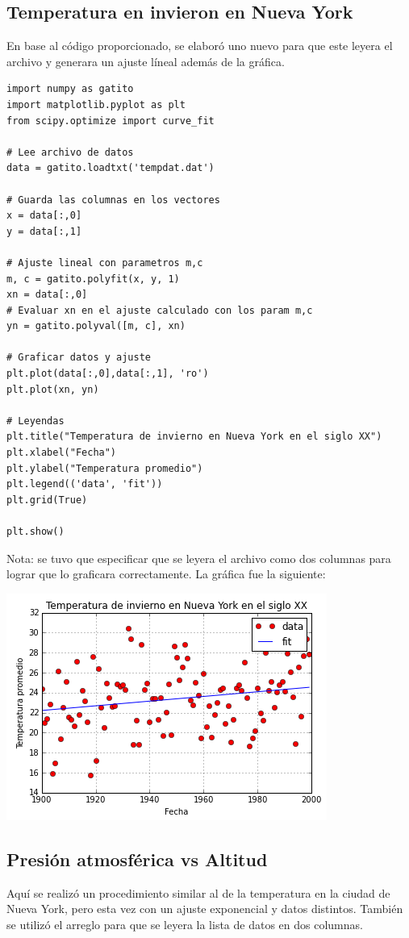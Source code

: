 \documentclass[12pt,letterpaper]{article}
\begin{document}
\subsection{Temperatura en invieron en Nueva York}
En base al código proporcionado, se elaboró uno nuevo para que este leyera el archivo y generara un ajuste líneal además de la gráfica.

\begin{verbatim}
import numpy as gatito
import matplotlib.pyplot as plt
from scipy.optimize import curve_fit

# Lee archivo de datos
data = gatito.loadtxt('tempdat.dat')

# Guarda las columnas en los vectores
x = data[:,0]
y = data[:,1]

# Ajuste lineal con parametros m,c
m, c = gatito.polyfit(x, y, 1)
xn = data[:,0]
# Evaluar xn en el ajuste calculado con los param m,c
yn = gatito.polyval([m, c], xn)

# Graficar datos y ajuste
plt.plot(data[:,0],data[:,1], 'ro')
plt.plot(xn, yn)

# Leyendas
plt.title("Temperatura de invierno en Nueva York en el siglo XX")
plt.xlabel("Fecha")
plt.ylabel("Temperatura promedio")
plt.legend(('data', 'fit'))
plt.grid(True)

plt.show()
\end{verbatim}
Nota: se tuvo que especificar que se leyera el archivo como dos columnas para lograr que lo graficara correctamente. La gráfica fue la siguiente:

\begin{center}
\includegraphics[scale=.7]{act4img2.png}
\end{center}

\subsection{Presión atmosférica vs Altitud}
Aquí se realizó un procedimiento similar al de la temperatura en la ciudad de Nueva York, pero esta vez con un ajuste exponencial y datos distintos. También se utilizó el arreglo para que se leyera la lista de datos en dos columnas.
\end{document}
